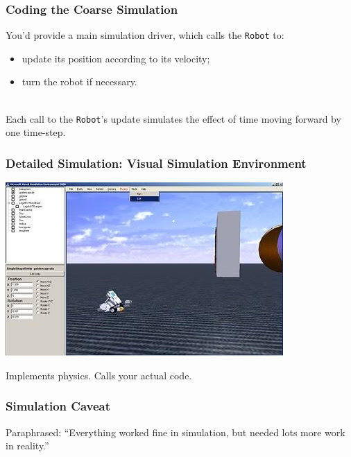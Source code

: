 \begin{frame}
\frametitle{Coding the Coarse Simulation}

\begin{changemargin}{2.5cm}

\Large
You'd provide a main simulation driver, which calls the {\tt Robot} to:
\begin{itemize}
\item update its position according to its velocity;
\item turn the robot if necessary.
\end{itemize}
~\\

Each call to the {\tt Robot}'s update simulates the effect of time moving forward
by one time-step.

\end{changemargin}

\end{frame}

\begin{frame}

\frametitle{\small Detailed Simulation: Visual Simulation Environment}

\includegraphics[width=\textwidth]{images/vse-shot1}
\begin{changemargin}{2.5cm}
Implements physics. Calls your actual code.
\end{changemargin}
\end{frame}

\begin{frame}

\frametitle{Simulation Caveat}

\begin{changemargin}{2.5cm}
\huge
Paraphrased: ``Everything worked fine in simulation, but needed
lots more work in reality.''
\end{changemargin}

\end{frame}

